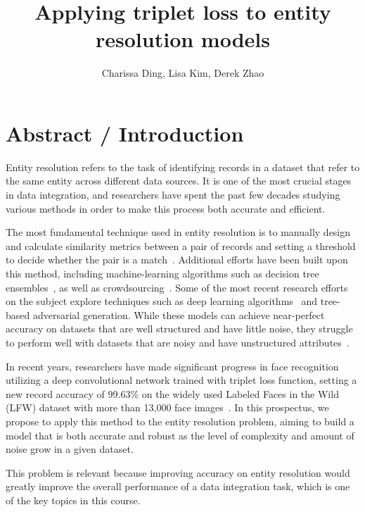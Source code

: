 \documentclass{proc}
\begin{document}
\title{Applying triplet loss to entity resolution models}

\author{Charissa Ding, Lisa Kim, Derek Zhao}

\maketitle

\section{Abstract / Introduction}

Entity resolution refers to the task of identifying records in a dataset that refer to the same entity across different data sources. It is one of the most crucial stages in data integration, and researchers have spent the past few decades studying various methods in order to make this process both accurate and efficient.

The most fundamental technique used in entity resolution is to manually design and calculate similarity metrics between a pair of records and setting a threshold to decide whether the pair is a match~\cite{elmagarmid2007duplicate}. Additional efforts have been built upon this method, including machine-learning algorithms such as decision tree ensembles~\cite{varma2017relic, yi2017method}, as well as crowdsourcing~\cite{gokhale2014corleone,wang2012crowder}. Some of the most recent research efforts on the subject explore techniques such as deep learning algorithms~\cite{ebraheem2017deeper} and tree-based adversarial generation. While these models can achieve near-perfect accuracy on datasets that are well structured and have little noise, they struggle to perform well with datasets that are noisy and have unstructured attributes~\cite{ebraheem2017deeper}.

In recent years, researchers have made significant progress in face recognition utilizing a deep convolutional network trained with triplet loss function, setting a new record accuracy of 99.63\% on the widely used Labeled Faces in the Wild (LFW) dataset with more than 13,000 face images~\cite{schroff2015facenet}. In this prospectus, we propose to apply this method to the entity resolution problem, aiming to build a model that is both accurate and robust as the level of complexity and amount of noise grow in a given dataset.

This problem is relevant because improving accuracy on entity resolution would greatly improve the overall performance of a data integration task, which is one of the key topics in this course.
\end{document}
